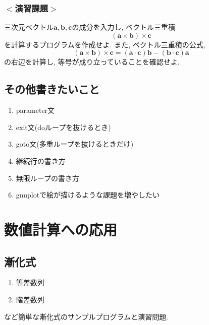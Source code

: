 \subsection*{$<$演習課題$>$}
三次元ベクトル$\bm{a}, \bm{b}, \bm{c}$の成分を入力し, ベクトル三重積
\begin{equation}
(\bm{a} \times \bm{b}) \times \bm{c}
\end{equation}
を計算するプログラムを作成せよ.
また, ベクトル三重積の公式,
\begin{equation}
(\bm{a} \times \bm{b}) \times \bm{c} = (\bm{a} \cdot \bm{c})\bm{b} - (\bm{b} \cdot \bm{c})\bm{a}
\end{equation}
の右辺を計算し, 等号が成り立っていることを確認せよ.
%

%
%
%


\section*{その他書きたいこと}
\begin{enumerate}
\item parameter文
\item exit文(doループを抜けるとき)
\item goto文(多重ループを抜けるときだけ)
\item 継続行の書き方
\item 無限ループの書き方
\item gnuplotで絵が描けるような課題を増やしたい
\end{enumerate}

\chapter{数値計算への応用}
\section{漸化式}
\begin{enumerate}
\item 等差数列
\item 階差数列
\end{enumerate}
など簡単な漸化式のサンプルプログラムと演習問題.


